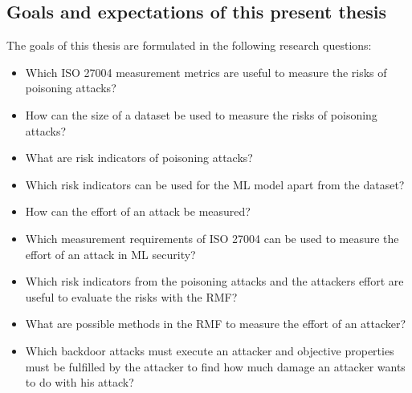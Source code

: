 \subsection{Goals and expectations of this present thesis}

The goals of this thesis are formulated in the following research questions:

\begin{itemize}
  \item Which ISO 27004 measurement metrics are useful to measure the risks of poisoning attacks?
  \item How can the size of a dataset be used to measure the risks of poisoning attacks?
  \item What are risk indicators of poisoning attacks?
  \item Which risk indicators can be used for the ML model apart from the dataset?
  \item How can the effort of an attack be measured?
  \item Which measurement requirements of ISO 27004 can be used to measure the effort of an attack in ML security?
  \item Which risk indicators from the poisoning attacks and the attackers effort are useful to evaluate the risks with the RMF?
  \item What are possible methods in the RMF to measure the effort of an attacker?
  \item Which backdoor attacks must execute an attacker and objective properties must be fulfilled by the attacker to find how much damage an attacker wants to do with his attack?
\end{itemize}
